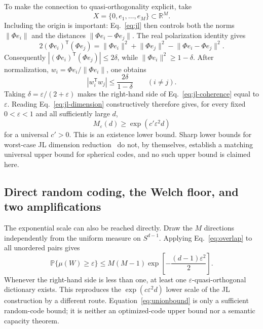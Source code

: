 \documentclass[
  aps,
  reprint,
  superscriptaddress,
  floatfix,
  nofootinbib,
  longbibliography
]{revtex4-2}
\newcommand{\R}{\mathbb{R}}
\newcommand{\Prob}{\mathbb{P}}
\newcommand{\Sph}[1]{S^{#1}}
\newcommand{\Msem}{M}
\newcommand{\T}{^{\mathsf{T}}}
\newcommand{\norm}[1]{\lVert #1 \rVert}
\begin{document}
To make the connection to quasi-orthogonality explicit, take
\[
X=\{0,e_1,\ldots,e_{\Msem}\}\subset\R^{\Msem}.
\]
Including the origin is important: Eq.~\eqref{eq:jl} then controls both the
norms $\norm{\Phi e_i}$ and the distances
$\norm{\Phi e_i-\Phi e_j}$.  The real
polarization identity gives
\begin{equation}
\label{eq:polarization}
2(\Phi e_i)\T(\Phi e_j)
=\norm{\Phi e_i}^2+\norm{\Phi e_j}^2
-\norm{\Phi e_i-\Phi e_j}^2.
\end{equation}
Consequently $|(\Phi e_i)\T(\Phi e_j)|\leq2\delta$, while
$\norm{\Phi e_i}^2\geq1-\delta$.  After normalization,
$w_i=\Phi e_i/\norm{\Phi e_i}$, one obtains
\begin{equation}
\label{eq:jl-coherence}
|w_i\T w_j|
\leq\frac{2\delta}{1-\delta}
\qquad(i\ne j).
\end{equation}
Taking $\delta=\varepsilon/(2+\varepsilon)$ makes the right-hand side of
Eq.~\eqref{eq:jl-coherence} equal to $\varepsilon$.  Reading
Eq.~\eqref{eq:jl-dimension} constructively therefore gives, for every fixed
$0<\varepsilon<1$ and all sufficiently large $d$,
\begin{equation}
\label{eq:jl-inverse}
M_\varepsilon(d)
\geq
\exp(c'\varepsilon^2d)
\end{equation}
for a universal $c'>0$.  This is an existence lower bound.  Sharp lower bounds for worst-case JL
dimension reduction~\cite{alon2016optimal,larsen-nelson-2017} do not, by
themselves, establish a matching universal upper bound for spherical codes,
and no such upper bound is claimed here.

\subsection{Direct random coding, the Welch floor, and two amplifications}
\label{sec:quasiortho}

The exponential scale can also be reached directly.  Draw the $\Msem$
directions independently from the uniform measure on $\Sph{d-1}$.  Applying
Eq.~\eqref{eq:overlap} to all unordered pairs gives
\begin{equation}
\label{eq:unionbound}
\Prob\{\mu(W)\geq\varepsilon\}
\leq
\Msem(\Msem-1)
\exp\!\left[-\frac{(d-1)\varepsilon^2}{2}\right].
\end{equation}
Whenever the right-hand side is less than one, at least one
$\varepsilon$-quasi-orthogonal dictionary exists.  This reproduces the
$\exp(c\varepsilon^2d)$ lower scale of the JL construction by a different
route.  Equation~\eqref{eq:unionbound} is only a sufficient random-code
bound; it is neither an optimized-code upper bound nor a semantic capacity
theorem.
\end{document}
